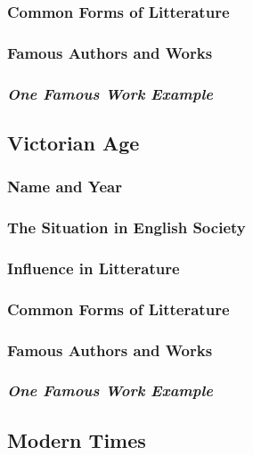 \subsubsection{Common Forms of Litterature}

\subsubsection{Famous Authors and Works}

\subsubsection{\textit{One Famous Work Example}}

\newpage
\subsection{Victorian Age}

\subsubsection{Name and Year}

\subsubsection{The Situation in English Society}

\subsubsection{Influence in Litterature}

\subsubsection{Common Forms of Litterature}

\subsubsection{Famous Authors and Works}

\subsubsection{\textit{One Famous Work Example}}

\newpage
\subsection{Modern Times}

